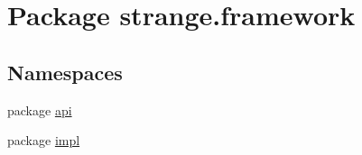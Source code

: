 \hypertarget{namespacestrange_1_1framework}{\section{Package strange.\-framework}
\label{namespacestrange_1_1framework}
}
\subsection*{Namespaces}
\begin{DoxyCompactItemize}
\item 
package \hyperlink{namespacestrange_1_1framework_1_1api}{api}
\item 
package \hyperlink{namespacestrange_1_1framework_1_1impl}{impl}
\end{DoxyCompactItemize}
